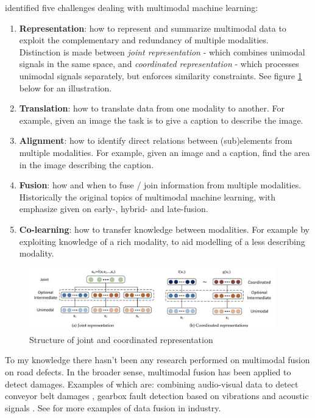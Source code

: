  identified five challenges dealing with multimodal machine learning:
\begin{enumerate}
\item \textbf{Representation}: how to represent and summarize multimodal data to exploit the complementary and redundancy of multiple modalities. Distinction is made between \textit{joint representation} - which combines unimodal signals in the same space, and \textit{coordinated representation} - which processes unimodal signals separately, but enforces similarity constraints. See figure \ref{fig:structure-joint-coordinated} below for an illustration.
\item \textbf{Translation}: how to translate data from one modality to another. For example, given an image the task is to give a caption to describe the image.
\item \textbf{Alignment}: how to identify direct relations between (sub)elements from multiple modalities. For example, given an image and a caption, find the area in the image describing the caption.
\item \textbf{Fusion}: how and when to fuse / join information from multiple modalities. Historically the original topics of multimodal machine learning, with emphasize given on early-, hybrid- and late-fusion.
\item \textbf{Co-learning}: how to transfer knowledge between modalities. For example by exploiting knowledge of a rich modality, to aid modelling of a less describing modality.
\end{enumerate}

\begin{figure}[ht]
\begin{center}
\includegraphics[width=0.95\textwidth,keepaspectratio]{images/2_literature/joint-vs-coordinated-representations.png}
\end{center}
\captionsetup{width=0.95\textwidth}
\caption{Structure of joint and coordinated representation \cite{Baltrusaitis2017}}
\label{fig:structure-joint-coordinated}
\end{figure}

To my knowledge there hasn't been any research performed on multimodal fusion on road defects. In the broader sense, multimodal fusion has been applied to detect damages. Examples of which are: combining audio-visual data to detect conveyor belt damages \cite{Che2021}, gearbox fault detection based on vibrations and acoustic signals \cite{Li2016}. See \cite{Olivan2018} for more examples of data fusion in industry.

